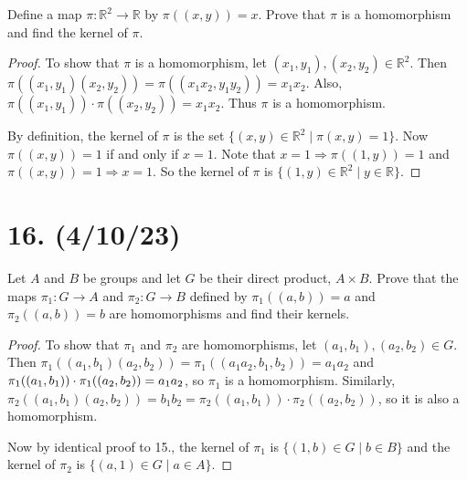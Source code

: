 \documentclass{article}
\begin{document}
Define a map $\pi: \mathbb{R}^2 \rightarrow \mathbb{R}$ by $\pi((x, y)) = x$. Prove that $\pi$ is a homomorphism and find the kernel of $\pi$.

\begin{proof}
    To show that $\pi$ is a homomorphism, let $(x_1, y_1), (x_2, y_2) \in \mathbb{R}^2$. Then $\pi((x_1, y_1)(x_2, y_2)) = \pi((x_1 x_2, y_1 y_2)) = x_1 x_2$. Also, $\pi((x_1, y_1)) \cdot \pi((x_2, y_2)) = x_1 x_2$. Thus $\pi$ is a homomorphism.

    By definition, the kernel of $\pi$ is the set $\{ (x, y) \in \mathbb{R}^2 \mid \pi(x, y) = 1 \}$. Now $\pi((x, y)) = 1$ if and only if $x = 1$. Note that $x = 1 \Rightarrow \pi((1, y)) = 1$ and $\pi((x, y)) = 1 \Rightarrow x = 1$. So the kernel of $\pi$ is $\{ (1, y) \in \mathbb{R}^2 \mid y \in \mathbb{R} \}$.
\end{proof}

\section*{16. (4/10/23)}

Let $A$ and $B$ be groups and let $G$ be their direct product, $A \times B$. Prove that the maps $\pi_1: G \rightarrow A$ and $\pi_2: G \rightarrow B$ defined by $\pi_1((a, b)) = a$ and $\pi_2((a, b)) = b$ are homomorphisms and find their kernels.

\begin{proof}
    To show that $\pi_1$ and $\pi_2$ are homomorphisms, let $(a_1, b_1), (a_2, b_2) \in G$. Then $\pi_1((a_1, b_1)(a_2, b_2)) = \pi_1((a_1 a_2, b_1, b_2)) = a_1 a_2$ and $\pi_1((a_1, b_1)) \cdot \pi_1((a_2, b_2)) \newline 
    = a_1 a_2$, so $\pi_1$ is a homomorphism. Similarly, $\pi_2((a_1, b_1)(a_2, b_2)) = b_1 b_2 = \pi_2((a_1, b_1)) \cdot \pi_2((a_2, b_2))$, so it is also a homomorphism.

    Now by identical proof to 15., the kernel of $\pi_1$ is $\{ (1, b) \in G \mid b \in B \}$ and the kernel of $\pi_2$ is $\{ (a, 1) \in G \mid a \in A \}$.
\end{proof}
\end{document}
